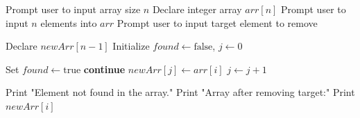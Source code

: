 \begin{algorithm}[H]
\caption{Remove First Occurrence of Element from Array}
\begin{algorithmic}[1]
\STATE Prompt user to input array size $n$
\STATE Declare integer array $arr[n]$
\STATE Prompt user to input $n$ elements into $arr$
\STATE Prompt user to input target element to remove

\STATE Declare $newArr[n-1]$
\STATE Initialize $found \gets \text{false}$, $j \gets 0$

        \STATE Set $found \gets \text{true}$ 
        \STATE \textbf{continue}
    \ENDIF
        \STATE $newArr[j] \gets arr[i]$
        \STATE $j \gets j + 1$
    \ENDIF
\ENDFOR

    \STATE Print "Element not found in the array."
\ELSE
    \STATE Print "Array after removing target:"
        \STATE Print $newArr[i]$
    \ENDFOR
\ENDIF
\end{algorithmic}
\end{algorithm}